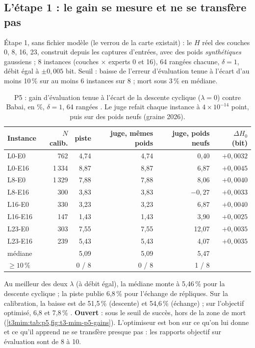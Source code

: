 \subsection{L'étape 1 : le gain se mesure et ne se transfère pas}\label{t3mim:sec:p5-etape1}

Étape 1, sans fichier modèle (le verrou de la carte existait) : le $H$ réel des couches 0, 8, 16, 23, construit depuis les captures d'entrées, avec des poids \emph{synthétiques} gaussiens ; 8 instances (couches $\times$ experts 0 et 16), 64 rangées chacune, $\delta = 1$, débit égal à $\pm 0{,}005$ bit. Seuil : baisse de l'erreur d'évaluation tenue à l'écart d'au moins 10\,\% sur au moins 6 instances sur 8 ; mort sous 3\,\% en médiane.

\begin{table}[tbp]
\centering\small
\caption[P5 : gains de la descente cyclique, piste et juge]{P5 : gain d'évaluation tenue à l'écart de la descente cyclique ($\lambda = 0$) contre Babai, en \%, $\delta = 1$, 64 rangées \mes. Le juge refait chaque instance à $4 \times 10^{-14}$ point, puis sur des poids neufs (graine 2026).}
\label{t3mim:tab:p5}
\begin{tabular}{@{}lrrrrr@{}}
\toprule
Instance & $N$ calib. & piste & juge, mêmes poids & juge, poids neufs & $\Delta H_0$ (bit) \\
\midrule
L0-E0 & 762 & 4,74 & 4,74 & 0,40 & $+0{,}0032$ \\
L0-E16 & 1\,334 & 8,87 & 8,87 & 6,87 & $+0{,}0045$ \\
L8-E0 & 1\,329 & 7,88 & 7,88 & 8,06 & $+0{,}0040$ \\
L8-E16 & 300 & 3,83 & 3,83 & $-0{,}27$ & $+0{,}0033$ \\
L16-E0 & 330 & 3,23 & 3,23 & 6,87 & $+0{,}0040$ \\
L16-E16 & 147 & 1,43 & 1,43 & 3,90 & $+0{,}0025$ \\
L23-E0 & 303 & 7,55 & 7,55 & 12,07 & $+0{,}0035$ \\
L23-E16 & 239 & 5,43 & 5,43 & 4,07 & $+0{,}0035$ \\
\midrule
médiane & & 5,09 & 5,09 & 5,47 & \\
$\ge 10\,\%$ & & 0 / 8 & 0 / 8 & 1 / 8 & \\
\bottomrule
\end{tabular}
\end{table}

Au meilleur des deux $\lambda$ (à débit égal), la médiane monte à 5,46\,\% pour la descente cyclique ; la piste publie 6,8\,\% pour l'échange de répliques. Sur la calibration, la baisse est de 51,5\,\% (descente) et 54,6\,\% (échange) ; sur l'objectif optimisé, 6,8 et 7,8\,\% \mes. \textbf{Ouvert} : sous le seuil de succès, hors de la zone de mort (\cref{t3mim:tab:p5,fig:t3-mim-p5-gains}). L'optimiseur est bon sur ce qu'on lui donne et ce qu'il apprend ne se transfère presque pas : les rapports objectif sur évaluation sont de 8 à 10.

